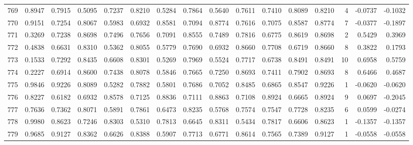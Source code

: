 \begin{tabular}{lrrrrrrrrrrrrrrr}
769 &      0.8947 &  0.7915 &  0.5095 &  0.7237 &  0.8210 &  0.5284 &  0.7864 &  0.5640 &  0.7611 &  0.7410 &   0.8089 &     0.8210 &      4 &                   -0.0737 &                    -0.1032 \\
770 &      0.9151 &  0.7254 &  0.8067 &  0.5983 &  0.6932 &  0.8581 &  0.7094 &  0.8774 &  0.7616 &  0.7075 &   0.8587 &     0.8774 &      7 &                   -0.0377 &                    -0.1897 \\
771 &      0.3269 &  0.7238 &  0.8698 &  0.7496 &  0.7656 &  0.7091 &  0.8555 &  0.7489 &  0.7816 &  0.6775 &   0.8619 &     0.8698 &      2 &                    0.5429 &                     0.3969 \\
772 &      0.4838 &  0.6631 &  0.8310 &  0.5362 &  0.8055 &  0.5779 &  0.7690 &  0.6932 &  0.8660 &  0.7708 &   0.6719 &     0.8660 &      8 &                    0.3822 &                     0.1793 \\
773 &      0.1533 &  0.7292 &  0.8435 &  0.6608 &  0.8301 &  0.5269 &  0.7969 &  0.5524 &  0.7717 &  0.6738 &   0.8491 &     0.8491 &     10 &                    0.6958 &                     0.5759 \\
774 &      0.2227 &  0.6914 &  0.8600 &  0.7438 &  0.8078 &  0.5846 &  0.7665 &  0.7250 &  0.8693 &  0.7411 &   0.7902 &     0.8693 &      8 &                    0.6466 &                     0.4687 \\
775 &      0.9846 &  0.9226 &  0.8089 &  0.5282 &  0.7882 &  0.5801 &  0.7686 &  0.7052 &  0.8485 &  0.6865 &   0.8547 &     0.9226 &      1 &                   -0.0620 &                    -0.0620 \\
776 &      0.8227 &  0.6182 &  0.6932 &  0.8578 &  0.7125 &  0.8836 &  0.7111 &  0.8863 &  0.7108 &  0.8924 &   0.6665 &     0.8924 &      9 &                    0.0697 &                    -0.2045 \\
777 &      0.7636 &  0.7362 &  0.8071 &  0.5891 &  0.7861 &  0.6473 &  0.8235 &  0.5768 &  0.7574 &  0.7547 &   0.7728 &     0.8235 &      6 &                    0.0599 &                    -0.0274 \\
778 &      0.9980 &  0.8623 &  0.7246 &  0.8303 &  0.5310 &  0.7813 &  0.6645 &  0.8311 &  0.5434 &  0.7817 &   0.6606 &     0.8623 &      1 &                   -0.1357 &                    -0.1357 \\
779 &      0.9685 &  0.9127 &  0.8362 &  0.6626 &  0.8388 &  0.5907 &  0.7713 &  0.6771 &  0.8614 &  0.7565 &   0.7389 &     0.9127 &      1 &                   -0.0558 &                    -0.0558 \\

\end{tabular}
